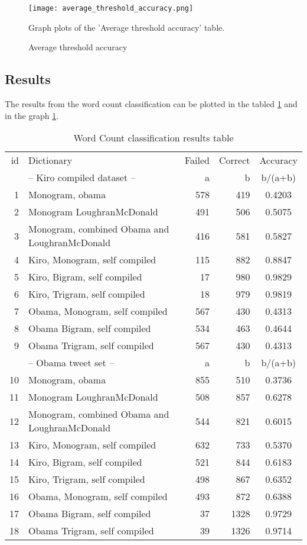 \begin{figure}[htb]
    \centering
    \texttt{[image: average\_threshold\_accuracy.png]} 
    \label{fig:average_threshold_accuracy}
    \caption{Average threshold accuracy}
Graph plots of the 'Average threshold accuracy' table.
\end{figure}
%

\subsection{Results}
The results from the word count classification can be plotted in the tabled
\ref{tbl:sentiment_word_count_results} and in the graph
\ref{tbl:sentiment_word_count_results}.

\begin{table}
\centering
\label{tbl:sentiment_word_count_results}
\caption{Word Count classification results table}
\begin{tabular}{ r p{6cm} r r c }
id & Dictionary & Failed & Correct & Accuracy \\
& -- Kiro compiled dataset -- & a & b & b/(a+b) \\
\hline
1 & Monogram, obama & 578 & 419 & 0.4203 \\
2 & Monogram LoughranMcDonald & 491 & 506 & 0.5075 \\
3 & Monogram, combined Obama and LoughranMcDonald & 416 & 581 & 0.5827 \\
4 & Kiro, Monogram, self compiled & 115 & 882 & 0.8847 \\
5 & Kiro, Bigram, self compiled & 17 & 980 & 0.9829 \\
6 & Kiro, Trigram, self compiled & 18 & 979 & 0.9819 \\
7 & Obama, Monogram, self compiled & 567 & 430 & 0.4313 \\
8 & Obama Bigram, self compiled & 534 & 463 & 0.4644 \\
9 & Obama Trigram, self compiled & 567 & 430 & 0.4313 \\
& -- Obama tweet set -- & a & b & b/(a+b) \\
\hline
10 & Monogram, obama & 855 & 510 & 0.3736 \\
11 & Monogram LoughranMcDonald & 508 & 857 & 0.6278 \\
12 & Monogram, combined Obama and LoughranMcDonald & 544 & 821 & 0.6015 \\
13 & Kiro, Monogram, self compiled & 632 & 733 & 0.5370 \\
14 & Kiro, Bigram, self compiled & 521 & 844 & 0.6183 \\
15 & Kiro, Trigram, self compiled & 498 & 867 & 0.6352 \\
16 & Obama, Monogram, self compiled & 493 & 872 & 0.6388 \\
17 & Obama Bigram, self compiled & 37 & 1328 & 0.9729 \\
18 & Obama Trigram, self compiled & 39 & 1326 & 0.9714 \\
\end{tabular}
\end{table}

